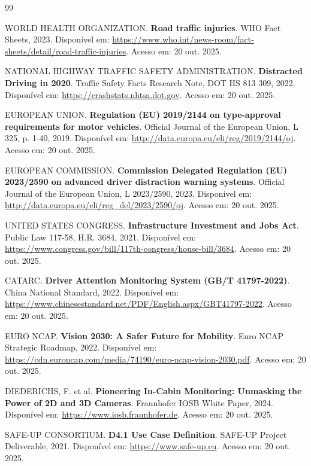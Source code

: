 \documentclass[12pt, a4paper]{article}
\begin{document}
\begin{thebibliography}{99}

WORLD HEALTH ORGANIZATION. \textbf{Road traffic injuries}. WHO Fact Sheets, 2023. Disponível em: \url{https://www.who.int/news-room/fact-sheets/detail/road-traffic-injuries}. Acesso em: 20 out. 2025.

NATIONAL HIGHWAY TRAFFIC SAFETY ADMINISTRATION. \textbf{Distracted Driving in 2020}. Traffic Safety Facts Research Note, DOT HS 813 309, 2022. Disponível em: \url{https://crashstats.nhtsa.dot.gov}. Acesso em: 20 out. 2025.

EUROPEAN UNION. \textbf{Regulation (EU) 2019/2144 on type-approval requirements for motor vehicles}. Official Journal of the European Union, L 325, p. 1-40, 2019. Disponível em: \url{http://data.europa.eu/eli/reg/2019/2144/oj}. Acesso em: 20 out. 2025.

EUROPEAN COMMISSION. \textbf{Commission Delegated Regulation (EU) 2023/2590 on advanced driver distraction warning systems}. Official Journal of the European Union, L 2023/2590, 2023. Disponível em: \url{http://data.europa.eu/eli/reg_del/2023/2590/oj}. Acesso em: 20 out. 2025.

UNITED STATES CONGRESS. \textbf{Infrastructure Investment and Jobs Act}. Public Law 117-58, H.R. 3684, 2021. Disponível em: \url{https://www.congress.gov/bill/117th-congress/house-bill/3684}. Acesso em: 20 out. 2025.

CATARC. \textbf{Driver Attention Monitoring System (GB/T 41797-2022)}. China National Standard, 2022. Disponível em: \url{https://www.chinesestandard.net/PDF/English.aspx/GBT41797-2022}. Acesso em: 20 out. 2025.

EURO NCAP. \textbf{Vision 2030: A Safer Future for Mobility}. Euro NCAP Strategic Roadmap, 2022. Disponível em: \url{https://cdn.euroncap.com/media/74190/euro-ncap-vision-2030.pdf}. Acesso em: 20 out. 2025.

DIEDERICHS, F. et al. \textbf{Pioneering In-Cabin Monitoring: Unmasking the Power of 2D and 3D Cameras}. Fraunhofer IOSB White Paper, 2024. Disponível em: \url{https://www.iosb.fraunhofer.de}. Acesso em: 20 out. 2025.

SAFE-UP CONSORTIUM. \textbf{D4.1 Use Case Definition}. SAFE-UP Project Deliverable, 2021. Disponível em: \url{https://www.safe-up.eu}. Acesso em: 20 out. 2025.


\end{thebibliography}
\end{document}
